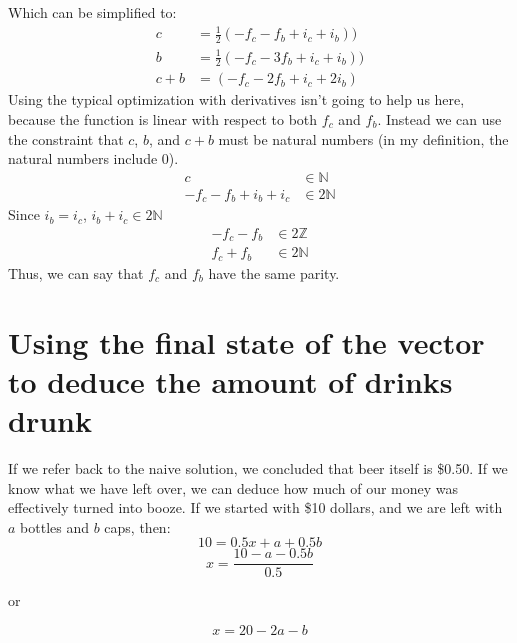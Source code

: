 \documentclass[letterpaper, 12pt]{article}
\begin{document}
Which can be simplified to:
\begin{align*}
    c &= \frac{1}{2}(-f_c - f_b  + i_c + i_b))\\
    b &= \frac{1}{2}(-f_c - 3f_b + i_c + i_b))\\
    c + b &= (-f_c - 2f_b + i_c + 2i_b)
\end{align*}
Using the typical optimization with derivatives isn't going to help us here, because the function is linear with respect to both $f_c$ and $f_b$.
Instead we can use the constraint that $c$, $b$, and $c + b$ must be natural numbers (in my definition, the natural numbers include 0).
\begin{align*}
    c &\in \mathbb{N} \\
    -f_c - f_b + i_b + i_c &\in 2\mathbb{N}
\end{align*}
Since $i_b = i_c$, $i_b + i_c \in 2\mathbb{N}$
\begin{align*}
    -f_c - f_b &\in 2\mathbb{Z}\\
    f_c + f_b &\in 2\mathbb{N}
\end{align*}
Thus, we can say that $f_c$ and $f_b$ have the same parity.
\section{Using the final state of the vector to deduce the amount of drinks drunk}
\par If we refer back to the naive solution, we concluded that beer itself is \$0.50.
If we know what we have left over, we can deduce how much of our money was effectively turned into booze.
If we started with \$10 dollars, and we are left with $a$ bottles and $b$ caps, then:
$$10 = 0.5x + a + 0.5b$$
$$x = \frac{10 - a - 0.5b}{0.5}$$
\begin{center}
    or
\end{center}
\begin{equation}
x = 20 - 2a - b
\end{equation}
\end{document}
